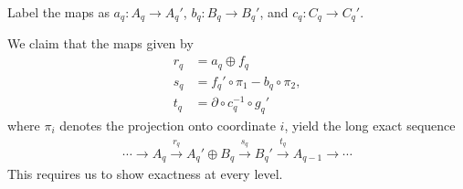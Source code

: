 \documentclass[10pt]{mypackage}
\begin{document}
\begin{solution}
  Label the maps as $a_q\colon A_q\rightarrow A_q'$, $b_q\colon B_q\rightarrow B_q'$, and $c_q\colon C_q\rightarrow C_{q}'$.

  We claim that the maps given by
  \begin{align*}
    r_q &= a_q\oplus f_q\\
    s_q &= f_q'\circ \pi_1 - b_q\circ \pi_2,\\
    t_q &= \partial\circ c_q^{-1}\circ g_q'
  \end{align*}
  where $\pi_i$ denotes the projection onto coordinate $i$, yield the long exact sequence
  \begin{align*}
    \cdots\rightarrow A_q \xrightarrow{r_q} A_q'\oplus B_q \xrightarrow{s_q} B_q' \xrightarrow{t_q} A_{q-1}\rightarrow\cdots
  \end{align*}
  This requires us to show exactness at every level.


\end{solution}
\end{document}
